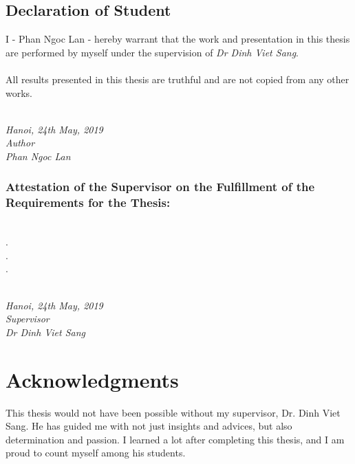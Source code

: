 \documentclass[a4paper, 12pt, oneside]{report}
\begin{document}
\begin{spacing}{1.0}
    \section*{Declaration of Student}
    I - Phan Ngoc Lan - hereby warrant that the work and presentation in this thesis are performed by myself under the supervision of \textit{Dr Dinh Viet Sang}.\\\\
    All results presented in this thesis are truthful and are not copied from any other works.\\\\
    \begin{minipage}{0.5\textwidth}
        \hfill
    \end{minipage}
    \begin{minipage}[t]{0.5\textwidth}
        \begin{center}
        \textit{Hanoi, 24th May, 2019\\Author\\[1cm]Phan Ngoc Lan}
        \end{center}
    \end{minipage}
    \subsection*{Attestation of the Supervisor on the Fulfillment of the
    Requirements for the Thesis:}
    \dotfill\\.\dotfill\\.\dotfill\\.\dotfill\\\\
    \begin{minipage}{0.5\textwidth}
        \hfill
    \end{minipage}
    \begin{minipage}[t]{0.5\textwidth}
        \begin{center}
    \textit{Hanoi, 24th May, 2019\\Supervisor\\[1cm]Dr Dinh Viet Sang}
        \end{center}
    \end{minipage}
\end{spacing}

\chapter*{Acknowledgments}
This thesis would not have been possible without my supervisor, Dr. Dinh Viet Sang. He has guided me with not just insights and advices, but also determination and passion. I learned a lot after completing this thesis, and I am proud to count myself among his students.
\end{document}
